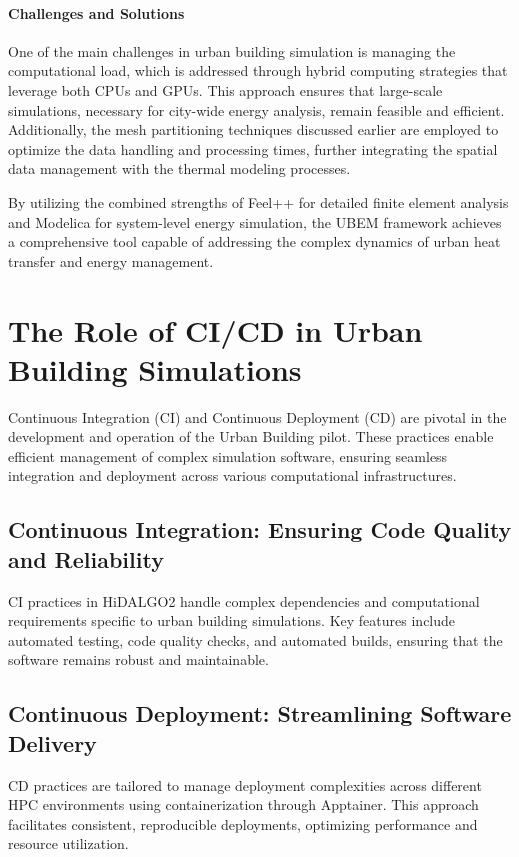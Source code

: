 \documentclass[runningheads]{llncs}
\begin{document}
\paragraph{Challenges and Solutions}
One of the main challenges in urban building simulation is managing the computational load, which is addressed through hybrid computing strategies that leverage both CPUs and GPUs. This approach ensures that large-scale simulations, necessary for city-wide energy analysis, remain feasible and efficient. Additionally, the mesh partitioning techniques discussed earlier are employed to optimize the data handling and processing times, further integrating the spatial data management with the thermal modeling processes.

By utilizing the combined strengths of Feel++ for detailed finite element analysis and Modelica for system-level energy simulation, the UBEM framework achieves a comprehensive tool capable of addressing the complex dynamics of urban heat transfer and energy management.

\section{The Role of CI/CD in Urban Building Simulations}
Continuous Integration (CI) and Continuous Deployment (CD) are pivotal in the development and operation of the Urban Building pilot. These practices enable efficient management of complex simulation software, ensuring seamless integration and deployment across various computational infrastructures.

\subsection{Continuous Integration: Ensuring Code Quality and Reliability}
CI practices in HiDALGO2 handle complex dependencies and computational requirements specific to urban building simulations. Key features include automated testing, code quality checks, and automated builds, ensuring that the software remains robust and maintainable.

\subsection{Continuous Deployment: Streamlining Software Delivery}
CD practices are tailored to manage deployment complexities across different HPC environments using containerization through Apptainer. This approach facilitates consistent, reproducible deployments, optimizing performance and resource utilization.
\end{document}
